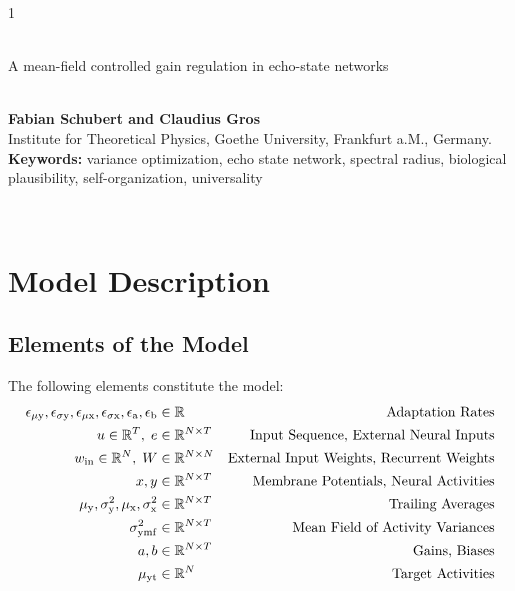 \documentclass[12pt]{article}
\begin{document}
\hspace{13.9cm}1

\ \vspace{20mm}\\

{\LARGE\noindent A  mean-field controlled gain regulation in echo-state networks}

\ \\
{\bf \large Fabian Schubert and Claudius Gros}\\
{Institute for Theoretical Physics, Goethe University, Frankfurt a.M., Germany.}\\
%

\noindent
{\bf Keywords:} variance optimization, echo state network, spectral radius, 
biological plausibility, self-organization, universality

\thispagestyle{empty}
%
\ \vspace{-0mm}\\
%
\section{Model Description}

\subsection{Elements of the Model}
The following elements constitute the model:
\begin{align*}
	\epsilon_{\rm \mu y},\epsilon_{\rm \sigma y},\epsilon_{\rm \mu x},\epsilon_{\rm \sigma x},\epsilon_{\rm a},\epsilon_{\rm b} &\in \mathbb{R} &\textrm{Adaptation Rates}\\
	u \in \mathbb{R}^T,\; e &\in \mathbb{R}^{N\times T} &\textrm{Input Sequence, External Neural Inputs}\\
	w_{\rm in} \in \mathbb{R}^{N},\; W &\in \mathbb{R}^{N\times N} &\textrm{External Input Weights, Recurrent Weights}\\
	x,y &\in \mathbb{R}^{N\times T} &\textrm{Membrane Potentials, Neural Activities}\\ 
	\mu_{\rm y},\sigma^2_{\rm y},\mu_{\rm x},\sigma^2_{\rm x} &\in \mathbb{R}^{N\times T} &\textrm{Trailing Averages}\\ 
	\sigma^2_{\rm y mf} &\in \mathbb{R}^{N\times T} &\textrm{Mean Field of Activity Variances}\\
	a,b &\in \mathbb{R}^{N\times T}  &\textrm{Gains, Biases}\\
	\mu_{\rm y t} &\in \mathbb{R}^N  &\textrm{Target Activities}
\end{align*}
\end{document}
